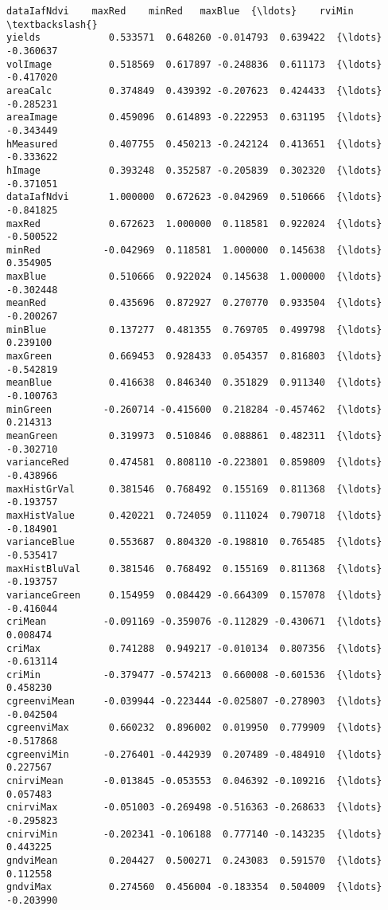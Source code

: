 \documentclass[11pt]{article}
\begin{document}
\begin{Verbatim}[commandchars=\\\{\}]
               dataIafNdvi    maxRed    minRed   maxBlue  {\ldots}    rviMin  \textbackslash{}
yields            0.533571  0.648260 -0.014793  0.639422  {\ldots} -0.360637
volImage          0.518569  0.617897 -0.248836  0.611173  {\ldots} -0.417020
areaCalc          0.374849  0.439392 -0.207623  0.424433  {\ldots} -0.285231
areaImage         0.459096  0.614893 -0.222953  0.631195  {\ldots} -0.343449
hMeasured         0.407755  0.450213 -0.242124  0.413651  {\ldots} -0.333622
hImage            0.393248  0.352587 -0.205839  0.302320  {\ldots} -0.371051
dataIafNdvi       1.000000  0.672623 -0.042969  0.510666  {\ldots} -0.841825
maxRed            0.672623  1.000000  0.118581  0.922024  {\ldots} -0.500522
minRed           -0.042969  0.118581  1.000000  0.145638  {\ldots}  0.354905
maxBlue           0.510666  0.922024  0.145638  1.000000  {\ldots} -0.302448
meanRed           0.435696  0.872927  0.270770  0.933504  {\ldots} -0.200267
minBlue           0.137277  0.481355  0.769705  0.499798  {\ldots}  0.239100
maxGreen          0.669453  0.928433  0.054357  0.816803  {\ldots} -0.542819
meanBlue          0.416638  0.846340  0.351829  0.911340  {\ldots} -0.100763
minGreen         -0.260714 -0.415600  0.218284 -0.457462  {\ldots}  0.214313
meanGreen         0.319973  0.510846  0.088861  0.482311  {\ldots} -0.302710
varianceRed       0.474581  0.808110 -0.223801  0.859809  {\ldots} -0.438966
maxHistGrVal      0.381546  0.768492  0.155169  0.811368  {\ldots} -0.193757
maxHistValue      0.420221  0.724059  0.111024  0.790718  {\ldots} -0.184901
varianceBlue      0.553687  0.804320 -0.198810  0.765485  {\ldots} -0.535417
maxHistBluVal     0.381546  0.768492  0.155169  0.811368  {\ldots} -0.193757
varianceGreen     0.154959  0.084429 -0.664309  0.157078  {\ldots} -0.416044
criMean          -0.091169 -0.359076 -0.112829 -0.430671  {\ldots}  0.008474
criMax            0.741288  0.949217 -0.010134  0.807356  {\ldots} -0.613114
criMin           -0.379477 -0.574213  0.660008 -0.601536  {\ldots}  0.458230
cgreenviMean     -0.039944 -0.223444 -0.025807 -0.278903  {\ldots} -0.042504
cgreenviMax       0.660232  0.896002  0.019950  0.779909  {\ldots} -0.517868
cgreenviMin      -0.276401 -0.442939  0.207489 -0.484910  {\ldots}  0.227567
cnirviMean       -0.013845 -0.053553  0.046392 -0.109216  {\ldots}  0.057483
cnirviMax        -0.051003 -0.269498 -0.516363 -0.268633  {\ldots} -0.295823
cnirviMin        -0.202341 -0.106188  0.777140 -0.143235  {\ldots}  0.443225
gndviMean         0.204427  0.500271  0.243083  0.591570  {\ldots}  0.112558
gndviMax          0.274560  0.456004 -0.183354  0.504009  {\ldots} -0.203990

\end{Verbatim}
\end{document}
